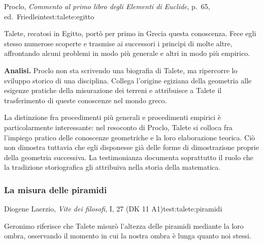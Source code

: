 \begin{testimonianza}{Proclo, \emph{Commento al primo libro degli Elementi di Euclide}, p.~65, ed.\ Friedlein}{test:talete:egitto}
\smallskip
{}\par
Talete, recatosi in Egitto, portò per primo in Grecia questa conoscenza. Fece egli stesso numerose scoperte e trasmise ai successori i principi di molte altre, affrontando alcuni problemi in modo più generale e altri in modo più empirico.
\end{testimonianza}



\noindent\textbf{Analisi.}
Proclo non sta scrivendo una biografia di Talete, ma ripercorre lo sviluppo storico di una disciplina. Collega l'origine egiziana della geometria alle esigenze pratiche della misurazione dei terreni e attribuisce a Talete il trasferimento di queste conoscenze nel mondo greco.

La distinzione fra procedimenti più generali e procedimenti empirici è particolarmente interessante: nel resoconto di Proclo, Talete si colloca fra l'impiego pratico delle conoscenze geometriche e la loro elaborazione teorica. Ciò non dimostra tuttavia che egli disponesse già delle forme di dimostrazione proprie della geometria successiva. La testimonianza documenta soprattutto il ruolo che la tradizione storiografica gli attribuiva nella storia della matematica.

\subsubsection{La misura delle piramidi}

\begin{testimonianza}{Diogene Laerzio, \emph{Vite dei filosofi}, I, 27 (DK 11 A1)}{test:talete:piramidi}
\smallskip
{}\par
Geronimo riferisce che Talete misurò l'altezza delle piramidi mediante la loro ombra, osservando il momento in cui la nostra ombra è lunga quanto noi stessi.
\end{testimonianza}

